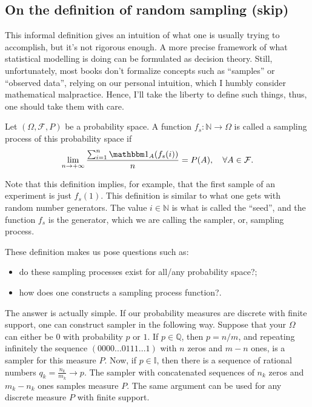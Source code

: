 \begin{shaded}
	\subsection*{On the definition of random sampling (skip)}
	This informal definition gives an intuition of what one is usually
	trying to accomplish, but it's not rigorous enough.
	A more precise framework of what statistical modelling is doing
	can be formulated as decision theory. Still, unfortunately,
	most books don't formalize concepts such as ``samples'' or ``observed data'',
	relying on our personal intuition, which I humbly consider mathematical malpractice.
	Hence, I'll take the liberty to define such things, thus, one should take them with care.

	\begin{definition}
		Let $(\Omega, \mathcal F, P)$ be a probability space. A
		function $f_s:\mathbb N \to \Omega$ is called a sampling
		process of this probability space if
		\begin{equation}
			\lim_{n \to +\infty} \frac{\sum^n_{i=1} \mathbbm 1_A(f_s(i))}{n}
			= P(A), \quad \forall A \in \mathcal F.
		\end{equation}

		Note that this definition implies, for example, that
		the first sample of an experiment is just $f_s(1)$.
		This definition is similar to what one gets with
		random number generators. The value $i \in \mathbb N$
		is what is called the ``seed'', and the function $f_s$
		is the generator, which we are calling the sampler, or,
		sampling process.
	\end{definition}

	These definition makes us pose questions such as:
	\begin{itemize}
		\item do these sampling processes exist for all/any probability space?;
		\item how does one constructs a sampling process function?.
	\end{itemize}

	The answer is actually simple. If our probability measures are discrete
	with finite support, one can construct sampler in the following way.
	Suppose that your $\Omega$ can either be $0$ with probability $p$
	or $1$. If $p\in \mathbb Q$, then $p= n/m$, and repeating infinitely the sequence
	$(0000...0111...1)$ with $n$ zeros and $m-n$ ones, is a sampler for
	this measure $P$. Now, if $p \in \mathbb I$, then there is a sequence
	of rational numbers $q_k = \frac{n_k}{m_k} \to p$. The sampler
	with concatenated sequences of $n_k$ zeros and $m_k - n_k$ ones
	samples measure $P$. The same argument can be used for any
	discrete measure $P$ with finite support.


\end{shaded}
